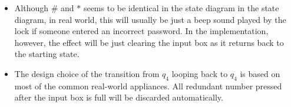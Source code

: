 \documentclass[12pt]{article}
\begin{document}
\begin{itemize}
  \item Although $\#$ and $*$ seems to be identical in the state diagram in the state diagram, in real world, this will usually be just a beep sound played by the lock if someone entered an incorrect password. In the implementation, however, the effect will be just clearing the input box as it returns back to the starting state.
  \item The design choice of the transition from $q_4$ looping back to $q_4$ is based on most of the common real-world appliances. All redundant number pressed after the input box is full will be discarded automatically.
\end{itemize}
\end{document}
